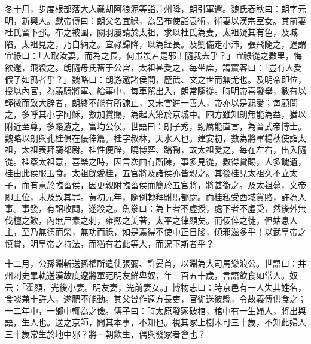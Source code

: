 \begin{pinyinscope}
冬十月，步度根部落大人戴胡阿狼泥等詣并州降，朗引軍還。魏氏春秋曰：朗字元明，新興人。獻帝傳曰：朗父名宜祿，為呂布使詣袁術，術妻以漢宗室女。其前妻杜氏留下邳。布之被圍，關羽屢請於太祖，求以杜氏為妻，太祖疑其有色，及城陷，太祖見之，乃自納之。宜祿歸降，以為銍長。及劉備走小沛，張飛隨之，過謂宜祿曰：「人取汝妻，而為之長，何蚩蚩若是邪！隨我去乎？」宜祿從之數里，悔欲還，飛殺之。朗隨母氏畜于公宮，太祖甚愛之，每坐席，謂賔客曰：「豈有人愛假子如孤者乎？」魏略曰：朗游遨諸侯間，歷武、文之世而無尤也。及明帝即位，授以內官，為驍騎將軍、給事中，每車駕出入，朗常隨從。時明帝喜發舉，數有以輕微而致大辟者，朗終不能有所諫止，又未甞進一善人，帝亦以是親愛；每顧問之，多呼其小字阿穌，數加賞賜，為起大第於京城中。四方雖知朗無能為益，猶以附近至尊，多賂遺之，富均公侯。世語曰：朗子秀，勁厲能直言，為晉武帝博士。魏略以朗與孔桂俱在佞倖篇。桂字叔林，天水人也。建安初，數為將軍楊秋使詣太祖，太祖表拜騎都尉。桂性便辟，曉博弈、蹹鞠，故太祖愛之，每在左右，出入隨從。桂察太祖意，喜樂之時，因言次曲有所陳，事多見從，數得賞賜，人多餽遺，桂由此侯服玉食。太祖旣愛桂，五官將及諸侯亦皆親之。其後桂見太祖久不立太子，而有意於臨菑侯，因更親附臨菑侯而簡於五官將，將甚銜之。及太祖薨，文帝即王位，未及致其罪。黃初元年，隨例轉拜駙馬都尉。而桂私受西域貨賂，許為人事。事發，有詔收問，遂殺之。魚豢曰：為上者不虛授，處下者不虛受，然後外無伐檀之歎，內無尸素之刺，雍熈之美著，太平之律顯矣。而佞倖之徒，但姑息人主，至乃無德而榮，無功而祿，如是焉得不使中正日朘，傾邪滋多乎！以武皇帝之慎賞，明皇帝之持法，而猶有若此等人，而況下斯者乎？

十二月，公孫淵斬送孫權所遣使張彌、許晏首，以淵為大司馬樂浪公。世語曰：并州刺史畢軌送漢故度遼將軍范明友鮮卑奴，年三百五十歲，言語飲食如常人。奴云：「霍顯，光後小妻。明友妻，光前妻女。」博物志曰：時京邑有一人失其姓名，食啖兼十許人，遂肥不能動。其父曾作遠方長吏，官徙送彼縣，令故義傳供食之；一二年中，一鄉中輒為之儉。傅子曰：時太原發冢破棺，棺中有一生婦人，將出與語，生人也。送之京師，問其本事，不知也。視其冢上樹木可三十歲，不知此婦人三十歲常生於地中邪？將一朝欻生，偶與發冢者會也？


\end{pinyinscope}
